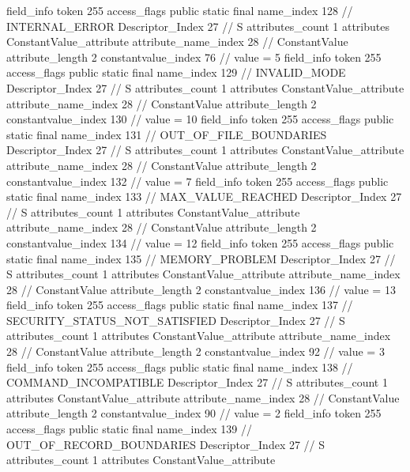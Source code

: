 {{{{{{{				}
				}
			}
			field_info {
				token	255
				access_flags	public static final
				name_index	128		// INTERNAL_ERROR
				Descriptor_Index	27		// S
				attributes_count	1
				attributes {
				ConstantValue_attribute {
					attribute_name_index	28		// ConstantValue
					attribute_length	2
					constantvalue_index	76		// value = 5
				}
				}
			}
			field_info {
				token	255
				access_flags	public static final
				name_index	129		// INVALID_MODE
				Descriptor_Index	27		// S
				attributes_count	1
				attributes {
				ConstantValue_attribute {
					attribute_name_index	28		// ConstantValue
					attribute_length	2
					constantvalue_index	130		// value = 10
				}
				}
			}
			field_info {
				token	255
				access_flags	public static final
				name_index	131		// OUT_OF_FILE_BOUNDARIES
				Descriptor_Index	27		// S
				attributes_count	1
				attributes {
				ConstantValue_attribute {
					attribute_name_index	28		// ConstantValue
					attribute_length	2
					constantvalue_index	132		// value = 7
				}
				}
			}
			field_info {
				token	255
				access_flags	public static final
				name_index	133		// MAX_VALUE_REACHED
				Descriptor_Index	27		// S
				attributes_count	1
				attributes {
				ConstantValue_attribute {
					attribute_name_index	28		// ConstantValue
					attribute_length	2
					constantvalue_index	134		// value = 12
				}
				}
			}
			field_info {
				token	255
				access_flags	public static final
				name_index	135		// MEMORY_PROBLEM
				Descriptor_Index	27		// S
				attributes_count	1
				attributes {
				ConstantValue_attribute {
					attribute_name_index	28		// ConstantValue
					attribute_length	2
					constantvalue_index	136		// value = 13
				}
				}
			}
			field_info {
				token	255
				access_flags	public static final
				name_index	137		// SECURITY_STATUS_NOT_SATISFIED
				Descriptor_Index	27		// S
				attributes_count	1
				attributes {
				ConstantValue_attribute {
					attribute_name_index	28		// ConstantValue
					attribute_length	2
					constantvalue_index	92		// value = 3
				}
				}
			}
			field_info {
				token	255
				access_flags	public static final
				name_index	138		// COMMAND_INCOMPATIBLE
				Descriptor_Index	27		// S
				attributes_count	1
				attributes {
				ConstantValue_attribute {
					attribute_name_index	28		// ConstantValue
					attribute_length	2
					constantvalue_index	90		// value = 2
				}
				}
			}
			field_info {
				token	255
				access_flags	public static final
				name_index	139		// OUT_OF_RECORD_BOUNDARIES
				Descriptor_Index	27		// S
				attributes_count	1
				attributes {
				ConstantValue_attribute {
}}}}}}}
